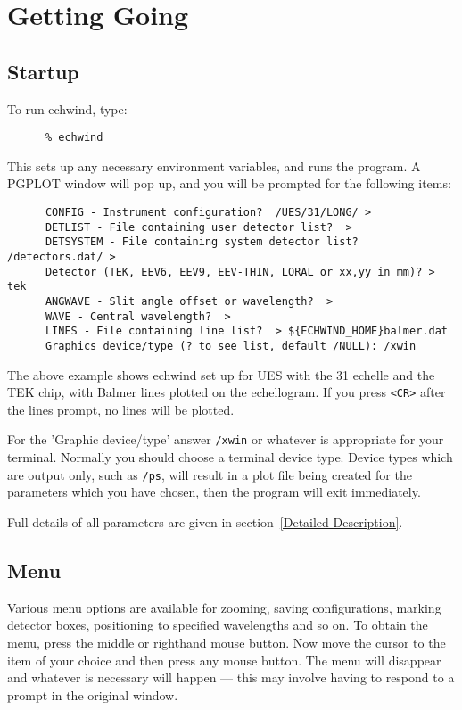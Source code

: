 \documentclass[11pt]{article}
\begin{document}
\section{Getting Going}
\subsection{Startup}

To run echwind, type:

\begin{verbatim}
      % echwind
\end{verbatim}

This sets up any necessary environment variables, and runs the program. A
PGPLOT window will pop up, and you will be prompted for the following
items:

\begin{verbatim}
      CONFIG - Instrument configuration?  /UES/31/LONG/ >
      DETLIST - File containing user detector list?  >
      DETSYSTEM - File containing system detector list?  /detectors.dat/ >
      Detector (TEK, EEV6, EEV9, EEV-THIN, LORAL or xx,yy in mm)? > tek
      ANGWAVE - Slit angle offset or wavelength?  >
      WAVE - Central wavelength?  >
      LINES - File containing line list?  > ${ECHWIND_HOME}balmer.dat
      Graphics device/type (? to see list, default /NULL): /xwin
\end{verbatim}

The above example shows echwind set up for UES with the 31 echelle and the
TEK chip, with Balmer lines plotted on the echellogram. If you press 
\verb+<CR>+ after the lines prompt, no lines will be plotted.

For the 'Graphic device/type' answer {\tt /xwin} or whatever is appropriate 
for your terminal. Normally you should choose a terminal device type. Device 
types which are output only, such as {\tt /ps}, will result in a plot file being
created for the parameters which you have chosen, 
then the program will exit immediately.

Full details of all parameters are given in section~\ref{Detailed Description}.

\subsection{Menu}

Various menu options are available for zooming, saving configurations,
marking detector boxes, positioning to specified wavelengths and so on. To
obtain the menu, press the middle or righthand mouse button.
Now move the cursor to the item of your choice and then press
any mouse button. The menu will disappear and whatever is necessary will
happen --- this may involve having to respond to a prompt in the original 
window.
\end{document}
